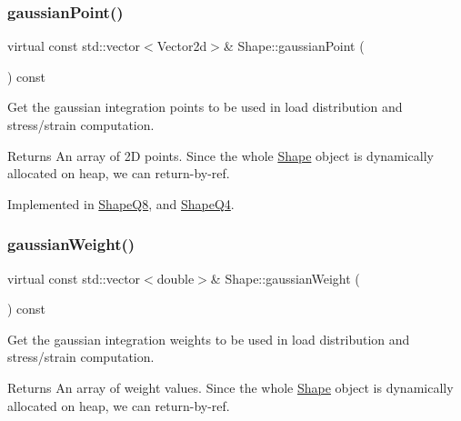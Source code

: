 \subsubsection{\texorpdfstring{gaussian\+Point()}{gaussianPoint()}}
{\footnotesize\ttfamily virtual const std\+::vector$<$Vector2d$>$\& Shape\+::gaussian\+Point (\begin{DoxyParamCaption}{ }\end{DoxyParamCaption}) const\hspace{0.3cm}{\ttfamily [pure virtual]}}



Get the gaussian integration points to be used in load distribution and stress/strain computation. 

\begin{DoxyReturn}{Returns}
An array of 2D points. Since the whole \mbox{\hyperlink{class_shape}{Shape}} object is dynamically allocated on heap, we can return-\/by-\/ref. 
\end{DoxyReturn}


Implemented in \mbox{\hyperlink{class_shape_q8_a197f1e2109c7ee6c29d27198c96928a4}{Shape\+Q8}}, and \mbox{\hyperlink{class_shape_q4_a5c185036352eabf489007b92f6d48ad2}{Shape\+Q4}}.

\mbox{\label{class_shape_a4257697bb443af2871a7cc7a82c8c823}} 
\subsubsection{\texorpdfstring{gaussian\+Weight()}{gaussianWeight()}}
{\footnotesize\ttfamily virtual const std\+::vector$<$double$>$\& Shape\+::gaussian\+Weight (\begin{DoxyParamCaption}{ }\end{DoxyParamCaption}) const\hspace{0.3cm}{\ttfamily [pure virtual]}}



Get the gaussian integration weights to be used in load distribution and stress/strain computation. 

\begin{DoxyReturn}{Returns}
An array of weight values. Since the whole \mbox{\hyperlink{class_shape}{Shape}} object is dynamically allocated on heap, we can return-\/by-\/ref. 
\end{DoxyReturn}


